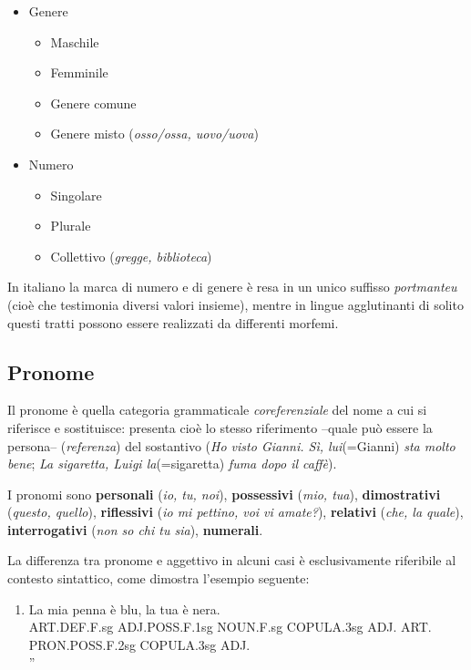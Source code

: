 \documentclass[a4paper,twoside,11pt,chapterprefix=false,bibliography=totocnumbered,listof=flat]{scrbook}
\providecommand{\tightlist}{%
  \setlength{\itemsep}{0pt}\setlength{\parskip}{0pt}}
\begin{document}
\begin{itemize}
\tightlist
\item
  Genere

  \begin{itemize}
  \tightlist
  \item
    Maschile
  \item
    Femminile
  \item
    Genere comune
  \item
    Genere misto (\emph{osso/ossa, uovo/uova})
  \end{itemize}
\item
  Numero

  \begin{itemize}
  \tightlist
  \item
    Singolare
  \item
    Plurale
  \item
    Collettivo (\emph{gregge, biblioteca})
  \end{itemize}
\end{itemize}

In italiano la marca di numero e di genere è resa in un unico suffisso
\emph{portmanteu} (cioè che testimonia diversi valori insieme), mentre
in lingue agglutinanti di solito questi tratti possono essere realizzati
da differenti morfemi.

\hypertarget{pronome}{%
\subsection{Pronome}\label{pronome}}

Il pronome è quella categoria grammaticale \emph{coreferenziale} del
nome a cui si riferisce e sostituisce: presenta cioè lo stesso
riferimento --quale può essere la persona-- (\emph{referenza}) del
sostantivo (\emph{Ho visto Gianni. Sì, lui}(=Gianni) \emph{sta molto
bene}; \emph{La sigaretta, Luigi la}(=sigaretta) \emph{fuma dopo il
caffè}).

I pronomi sono \textbf{personali} (\emph{io, tu, noi}),
\textbf{possessivi} (\emph{mio, tua}), \textbf{dimostrativi}
(\emph{questo, quello}), \textbf{riflessivi} (\emph{io mi pettino, voi
vi amate?}), \textbf{relativi} (\emph{che, la quale}),
\textbf{interrogativi} (\emph{non so chi tu sia}), \textbf{numerali}.

La differenza tra pronome e aggettivo in alcuni casi è esclusivamente
riferibile al contesto sintattico, come dimostra l'esempio seguente:

\begin{enumerate}
\def\labelenumi{(\arabic{enumi})}
\tightlist
\item
  \gll    La mia penna è blu, la tua è nera.\\
  ART.DEF.F.sg ADJ.POSS.F.1sg NOUN.F.sg COPULA.3sg ADJ. ART.
  PRON.POSS.F.2sg COPULA.3sg ADJ.\\
  \glt    ''
\end{enumerate}
\end{document}
